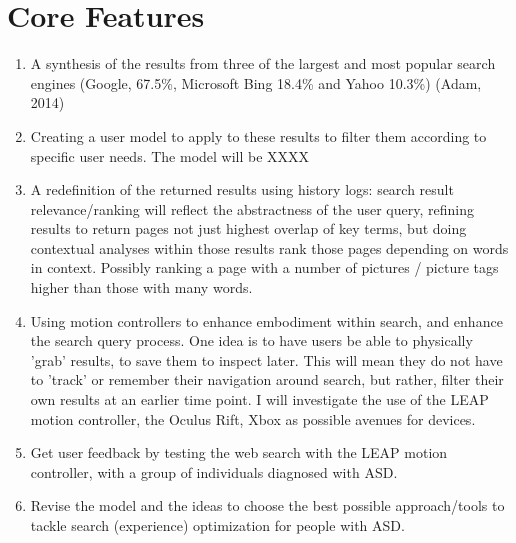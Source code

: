 \documentclass[10pt]{article}
\begin{document}
\section{Core Features}
\begin{enumerate}
\item A synthesis of the results from three of the largest and most popular search engines (Google, 67.5\%, Microsoft Bing 18.4\% and Yahoo 10.3\%) (Adam, 2014)

\item Creating a user model to apply to these results to filter them according to specific user needs. The model will be XXXX

\item A redefinition of the returned results using history logs: search result relevance/ranking will reflect the abstractness of the user query, refining results to return pages not just highest overlap of key terms, but doing contextual analyses within those results rank those pages depending on words in context. Possibly ranking a page with a number of pictures / picture tags higher than those with many words. 

\item Using motion controllers to enhance embodiment within search, and enhance the search query process. One idea is to have users be able to physically 'grab' results, to save them to inspect later. This will mean they do not have to 'track' or remember their navigation around search, but rather, filter their own results at an earlier time point. I will investigate the use of the LEAP motion controller, the Oculus Rift, Xbox as possible avenues for devices.

\item Get user feedback by testing the web search with the LEAP motion controller, with a group of individuals diagnosed with ASD.

\item Revise the model and the ideas to choose the best possible approach/tools to tackle search (experience) optimization for people with ASD.

\end{enumerate}
\end{document}
